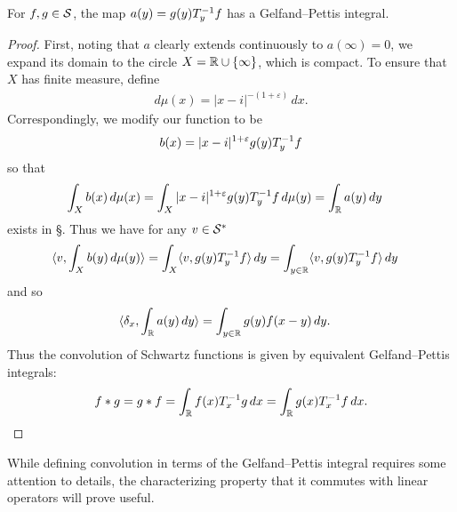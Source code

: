     \begin{claim}
      \label{claim:GPconv}
      For $f,g\in\S$, the map $a(y)=g(y)T_y\inv f$ has a Gelfand--Pettis integral.
    \end{claim}
    \begin{proof}
      First, noting that $a$ clearly extends continuously to $a(\infty)=0$, we expand its domain to the circle $X=\R\cup\{\infty\}$, which is compact.
      To ensure that $X$ has finite measure, define
      \begin{align*}
        d\mu(x) = |x-i|^{-(1+\varepsilon)}\,dx \text{.}
      \end{align*}
      Correspondingly, we modify our function to be
      \begin{align*}
        b(x) = |x-i|^{1+\varepsilon} g(y)T_y\inv f
      \end{align*}
      so that
      \begin{align*}
        \int_X b(x)\,d\mu(x)
        &= \int_{X} |x-i|^{1+\varepsilon} g(y)T_y\inv f\,d\mu(y)
        = \int_{\R} a(y)\,dy
      \end{align*}
      exists in \S.
      Thus we have for any $v\in\SS$
      \begin{align*}
        \langle v, \int_X b(y)\,d\mu(y) \rangle
        &= \int_X \langle v, g(y)T_y\inv f\rangle\, dy
        = \int_{y\in\R} \langle v, g(y)T_y\inv f\rangle\, dy
      \end{align*}
      and so
      \begin{align*}
        \langle \delta_x, \int_{\R} a(y)\,dy \rangle
        &= \int_{y\in\R} g(y)f(x-y)\,dy \text{.}
      \end{align*}
      Thus the convolution of Schwartz functions is given by equivalent Gelfand--Pettis integrals:
      \begin{align*}
        f*g = g*f = \int_\R f(x)T_x\inv g\,dx = \int_\R g(x)T_x\inv f\,dx \text{.}
      \end{align*}
    \end{proof}

    While defining convolution in terms of the Gelfand--Pettis integral requires some attention to details, the characterizing property that it commutes with linear operators will prove useful.

